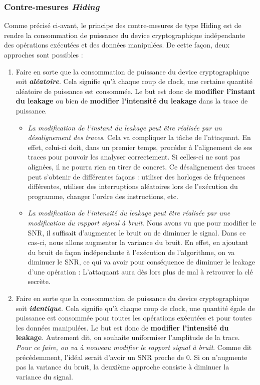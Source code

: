 \documentclass[10pt, oneside, a4paper]{article}
\begin{document}
\subsubsection{Contre-mesures \textit{Hiding}}
\label{sec:hiding}
\vspace{-0.1 cm}Comme précisé ci-avant, le principe des contre-mesures de type Hiding est de rendre la consommation de puissance du device cryptographique indépendante des opérations exécutées et des données manipulées. De cette façon, deux approches sont possibles :
\begin{enumerate}
\item Faire en sorte que la consommation de puissance du device cryptographique soit \textbf{\textit{aléatoire}}. Cela signifie qu'à chaque coup de clock, une certaine quantité aléatoire de puissance est consommée. Le but est donc de \textbf{modifier l'instant du leakage} ou bien de \textbf{modifier l'intensité du leakage} dans la trace de puissance.
\begin{itemize}
\item \textit{La modification de l'instant du leakage peut être réalisée par un désalignement des traces}. Cela va compliquer la tâche de l'attaquant. En effet, celui-ci doit, dans un premier temps, procéder à l'alignement de ses traces pour pouvoir les analyser correctement. Si celles-ci ne sont pas alignées, il ne pourra rien en tirer de concret. Ce désalignement des traces peut s’obtenir de différentes façons : utiliser des horloges de fréquences différentes, utiliser des interruptions aléatoires lors de l’exécution du programme, changer l’ordre des instructions, etc.
\item \textit{La modification de l'intensité du leakage peut être réalisée par une modification du rapport signal à bruit}. Nous avons vu que pour modifier le SNR, il suffisait d'augmenter le bruit ou de diminuer le signal. Dans ce cas-ci, nous allons augmenter la variance du bruit. En effet, en ajoutant du bruit de façon indépendante à l'exécution de l'algorithme, on va diminuer le SNR, ce qui va avoir pour conséquence de diminuer le leakage d'une opération : L'attaquant aura dès lors plus de mal à retrouver la clé secrète. 
\end{itemize}
\item Faire en sorte que la consommation de puissance du device cryptographique soit \textbf{\textit{identique}}. Cela signifie qu'à chaque coup de clock, une quantité égale de puissance est consommée pour toutes les opérations exécutées et pour toutes les données manipulées. Le but est donc de \textbf{modifier l'intensité du leakage}. Autrement dit, on souhaite uniformiser l'amplitude de la trace. 
\textit{Pour ce faire, on va à nouveau modifier le rapport signal à bruit}. Comme dit précédemment, l'idéal serait d'avoir un SNR proche de 0. Si on n'augmente pas la variance du bruit, la deuxième approche consiste à diminuer la variance du signal. 
\end{enumerate}
\end{document}

